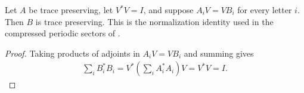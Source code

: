 \begin{lemma}
    \label{thm:trace_preserving_isometric_corner}
    \leanok
    Let $A$ be trace preserving, let $V^*V=I$, and suppose
    $A_iV=VB_i$ for every letter $i$. Then $B$ is trace preserving.
    This is the normalization identity used in the compressed periodic
    sectors of \cite[Section~2.1]{DeLasCuevas2017Irreducible}.
\end{lemma}
\begin{proof}\leanok
    Taking products of adjoints in $A_iV=VB_i$ and summing gives
    \begin{align}
        \sum_i B_i^*B_i
        =V^*\left(\sum_i A_i^*A_i\right)V
        =V^*V=I.
    \end{align}
\end{proof}

